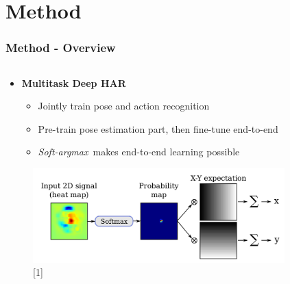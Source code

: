 \documentclass[9pt]{beamer}
\providecommand{\sourcefix}[1]{\\ \footnotesize \tugreen{Source:} [#1]}
\newenvironment{myframe}[1][]{%
\begin{frame}%
\frametitle{#1}
\setcounter{footnote}{0}


}{%
\end{frame}%
}
\begin{document}
\tableofcontents

\section{Method}

\begin{myframe}[Method - Overview]
	\begin{columns}[T]
        \begin{column}{.45\textwidth}
            \begin{itemize}
                \item \textbf{Multitask Deep HAR}\footnotemark
                \begin{itemize}
                    \item Jointly train pose and action recognition
                    \item Pre-train pose estimation part, then fine-tune end-to-end
                    \item \textit{Soft-argmax}\footnotemark~makes end-to-end learning possible
                \end{itemize}
            \end{itemize}
            \begin{figure}
                \includegraphics[width=0.99\textwidth]{softargmax.png}
                \sourcefix{1}
            \end{figure}
        \end{column}
        \begin{column}{.45\textwidth}
            \begin{figure}

\end{figure}
\end{column}
\end{columns}
\end{myframe}
\end{document}
